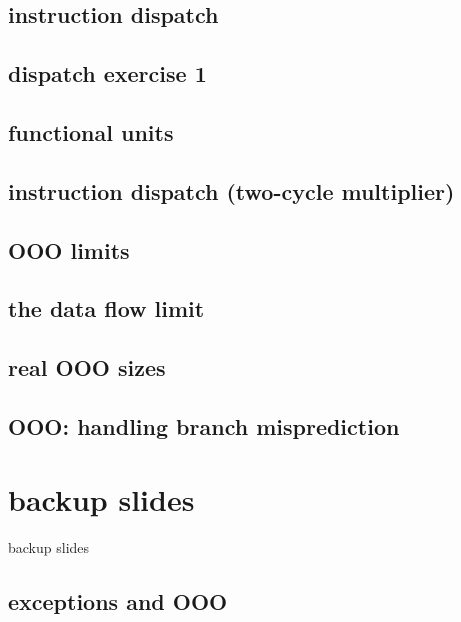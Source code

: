 \subsection{instruction dispatch}


\subsection{dispatch exercise 1}


\subsection{functional units}


\subsection{instruction dispatch (two-cycle multiplier)}



\subsection{OOO limits}


\subsection{the data flow limit}


\subsection{real OOO sizes}



\subsection{OOO: handling branch misprediction}


\section{backup slides}
\begin{frame}{backup slides}
\end{frame}

\subsection{exceptions and OOO}



